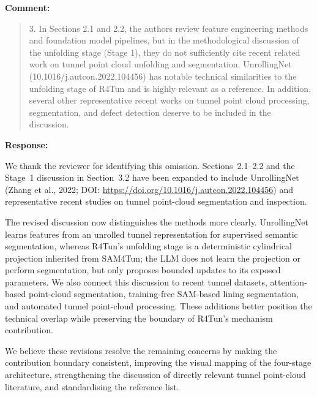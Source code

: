 \documentclass[11pt,a4paper]{article}
\newenvironment{commentblock}{%
  \par\smallskip\noindent\textbf{Comment:}\par
  \begin{quote}\itshape\color{black}
}{%
  \end{quote}\smallskip
}
\newenvironment{responseblock}{%
  \par\smallskip\noindent\textbf{Response:}\par
  \begingroup\color{responsegreen}
}{%
  \endgroup\smallskip
}
\begin{document}
\begin{commentblock}
3. In Sections 2.1 and 2.2, the authors review feature engineering methods and foundation model pipelines, but in the methodological discussion of the unfolding stage (Stage 1), they do not sufficiently cite recent related work on tunnel point cloud unfolding and segmentation. UnrollingNet (10.1016/j.autcon.2022.104456) has notable technical similarities to the unfolding stage of R4Tun and is highly relevant as a reference. In addition, several other representative recent works on tunnel point cloud processing, segmentation, and defect detection deserve to be included in the discussion.
\end{commentblock}
\begin{responseblock}
We thank the reviewer for identifying this omission. Sections~2.1--2.2 and the Stage~1 discussion in Section~3.2 have been expanded to include UnrollingNet (Zhang et al., 2022; DOI: \url{https://doi.org/10.1016/j.autcon.2022.104456}) and representative recent studies on tunnel point-cloud segmentation and inspection.

The revised discussion now distinguishes the methods more clearly. UnrollingNet learns features from an unrolled tunnel representation for supervised semantic segmentation, whereas R4Tun's unfolding stage is a deterministic cylindrical projection inherited from SAM4Tun; the LLM does not learn the projection or perform segmentation, but only proposes bounded updates to its exposed parameters. We also connect this discussion to recent tunnel datasets, attention-based point-cloud segmentation, training-free SAM-based lining segmentation, and automated tunnel point-cloud processing. These additions better position the technical overlap while preserving the boundary of R4Tun's mechanism contribution.
\end{responseblock}

\bigskip
\noindent We believe these revisions resolve the remaining concerns by making the contribution boundary consistent, improving the visual mapping of the four-stage architecture, strengthening the discussion of directly relevant tunnel point-cloud literature, and standardising the reference list.
\end{document}
